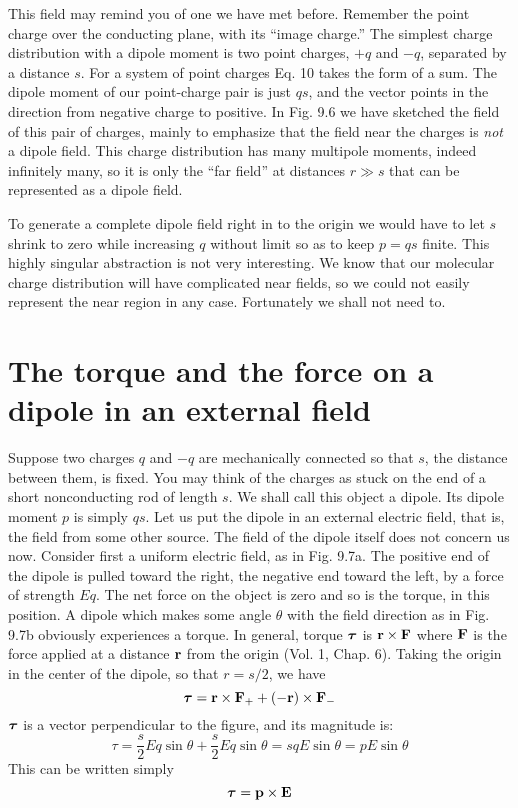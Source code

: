 This field may remind you of one we have met before. Remember
the point charge over the conducting plane, with its ``image charge.''
The simplest charge distribution with a dipole moment is two
point charges, $+q$ and  $-q$, separated by a distance $s$. For a system
of point charges Eq. 10 takes the form of a sum. The dipole moment
of our point-charge pair is just $qs$, and the vector points in the direction
from negative charge to positive. In Fig. 9.6 we have sketched
the field of this pair of charges, mainly to emphasize that the field
near the charges is \emph{not} a dipole field. This charge distribution has
many multipole moments, indeed infinitely many, so it is only the
``far field'' at distances $r \gg s$ that can be represented as a dipole field.

To generate a complete dipole field right in to the origin we would
have to let $s$ shrink to zero while increasing $q$ without limit so as to
keep $p = qs$ finite. This highly singular abstraction is not very 
interesting. We know that our molecular charge distribution will have
complicated near fields, so we could not easily represent the near
region in any case. Fortunately we shall not need to.

\section{The torque and the force on a dipole in an external field}

Suppose two charges $q$ and  $-	q$ are mechanically connected so
that $s$, the distance between them, is fixed. You may think of the
charges as stuck on the end of a short nonconducting rod of length $s$.
We shall call this object a dipole. Its dipole moment $p$ is simply $qs$.
Let us put the dipole in an external electric field, that is, the field from
some other source. The field of the dipole itself does not concern
us now. Consider first a uniform electric field, as in Fig. 9.7a. The
positive end of the dipole is pulled toward the right, the negative end
toward the left, by a force of strength $Eq$. The net force on the object
is zero and so is the torque, in this position. A dipole which makes
some angle $\theta$ with the field direction as in Fig. 9.7b obviously experiences
a torque. In general, torque $\boldsymbol{\tau}$ is $\mathbf{r} \times \mathbf{F}$ where $\mathbf{F}$ is the force
applied at a distance $\mathbf{r}$ from the origin (Vol. 1, Chap. 6). Taking the
origin in the center of the dipole, so that $r = s/2$, we have
\begin{equation}
  \boldsymbol{\tau} = \mathbf{r}\times\mathbf{F}_+ + (-\mathbf{r})\times\mathbf{F}_-
\end{equation}
$\boldsymbol{\tau}$ is a vector perpendicular to the figure, and its magnitude is:
\begin{equation}
  \tau = \frac{s}{2}Eq\sin\theta + \frac{s}{2}Eq\sin\theta = sqE\sin\theta = pE\sin\theta
\end{equation}
This can be written simply
\begin{equation}
  \boldsymbol{\tau} = \mathbf{p}\times\mathbf{E}
\end{equation}


